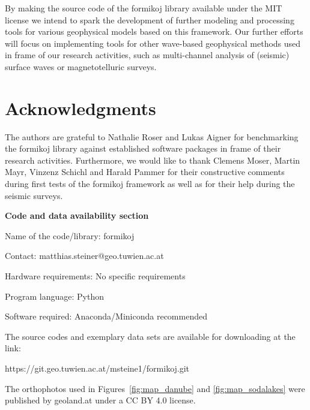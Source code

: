 \documentclass[a4paper,fleqn]{cas-sc}
\begin{document}
By making the source code of the formikoj library available under the MIT license we intend to spark the development of further modeling and processing tools for various geophysical models based on this framework. Our further efforts will focus on implementing tools for other wave-based geophysical methods used in frame of our research activities, such as multi-channel analysis of (seismic) surface waves or magnetotelluric surveys. 

\section{Acknowledgments}

The authors are grateful to Nathalie Roser and Lukas Aigner for benchmarking the formikoj library against established software packages in frame of their research activities. Furthermore, we would like to thank Clemens Moser, Martin Mayr, Vinzenz Schichl and Harald Pammer for their constructive comments during first tests of the formikoj framework as well as for their help during the seismic surveys.

\newpage

\textbf{Code and data availability section}

Name of the code/library: formikoj

Contact: matthias.steiner@geo.tuwien.ac.at

Hardware requirements: No specific requirements

Program language: Python
 
Software required: Anaconda/Miniconda recommended

The source codes and exemplary data sets are available for downloading at the link:

https://git.geo.tuwien.ac.at/msteine1/formikoj.git

The orthophotos used in Figures~\ref{fig:map_danube} and \ref{fig:map_sodalakes} were published by geoland.at under a CC BY 4.0 license.


 
\end{document}
